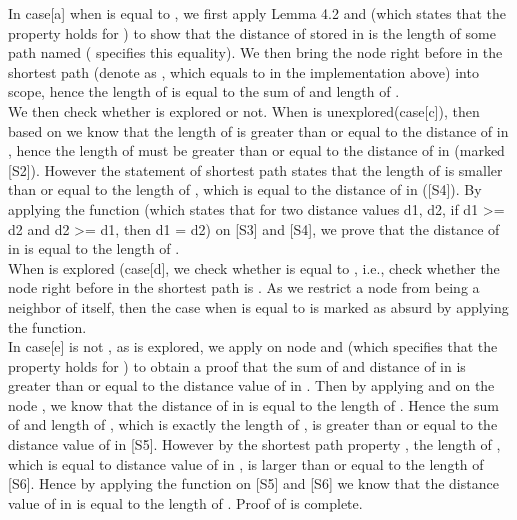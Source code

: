 In case[a] when  is equal to , we first apply Lemma 4.2  and (which states that the  property holds for ) to show that the distance of  stored in  is the length of some  path named  ( specifies this equality). We then bring the node  right before  in the shortest  path (denote as , which equals to  in the implementation above) into scope, hence the length of  is equal to the sum of  and length of . 
\\

We then check whether  is explored or not. When  is unexplored(case[c]), then based on  we know that the length of  is greater than or equal to the distance of  in , hence the length of  must be greater than or equal to the distance of  in (marked [S2]). However the statement of shortest path  states that the length of  is smaller than or equal to the length of , which is equal to the distance of  in ([S4]). By applying the function (which states that for two distance values d1, d2, if d1 >= d2 and d2 >= d1, then d1 = d2) on [S3] and [S4], we prove that the distance of  in  is equal to the length of .
\\

When  is explored (case[d], we check whether  is equal to , i.e., check whether the node right before  in the shortest path  is . As we restrict a node from being a neighbor of itself, then the case when  is equal to  is marked as absurd by applying the  function. 
\\

In case[e]  is not , as  is explored, we apply  on node  and  (which specifies that the  property holds for ) to obtain a proof that the sum of  and distance of  in  is greater than or equal to the distance value of  in . Then by applying  and  on the node , we know that the distance of  in  is equal to the length of . Hence the sum of  and length of , which is exactly the length of , is greater than or equal to the distance value of  in [S5]. However by the shortest path property , the length of , which is equal to distance value of  in , is larger than or equal to the length of  [S6]. Hence by applying the function  on [S5] and [S6] we know that the distance value of  in  is equal to the length of . Proof of  is complete. 
\\

